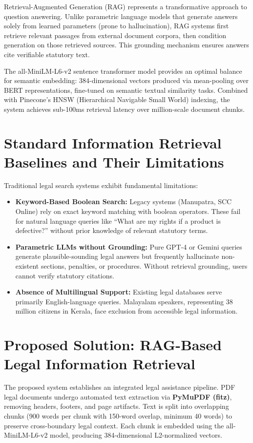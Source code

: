 \documentclass[12pt,a4paper]{report}
\begin{document}
Retrieval-Augmented Generation (RAG) represents a transformative approach to question answering. Unlike parametric language models that generate answers solely from learned parameters (prone to hallucination), RAG systems first retrieve relevant passages from external document corpora, then condition generation on those retrieved sources. This grounding mechanism ensures answers cite verifiable statutory text.

The all-MiniLM-L6-v2 sentence transformer model provides an optimal balance for semantic embedding: 384-dimensional vectors produced via mean-pooling over BERT representations, fine-tuned on semantic textual similarity tasks. Combined with Pinecone's HNSW (Hierarchical Navigable Small World) indexing, the system achieves sub-100ms retrieval latency over million-scale document chunks.

\section{Standard Information Retrieval Baselines and Their Limitations}
Traditional legal search systems exhibit fundamental limitations:
\begin{itemize}\setlength{\itemsep}{3pt}\setlength{\parskip}{0pt}\setlength{\parsep}{0pt}
    \item \textbf{Keyword-Based Boolean Search:} Legacy systems (Manupatra, SCC Online) rely on exact keyword matching with boolean operators. These fail for natural language queries like ``What are my rights if a product is defective?'' without prior knowledge of relevant statutory terms.
    \item \textbf{Parametric LLMs without Grounding:} Pure GPT-4 or Gemini queries generate plausible-sounding legal answers but frequently hallucinate non-existent sections, penalties, or procedures. Without retrieval grounding, users cannot verify statutory citations.
    \item \textbf{Absence of Multilingual Support:} Existing legal databases serve primarily English-language queries. Malayalam speakers, representing 38 million citizens in Kerala, face exclusion from accessible legal information.
\end{itemize}

\section{Proposed Solution: RAG-Based Legal Information Retrieval}
The proposed system establishes an integrated legal assistance pipeline. PDF legal documents undergo automated text extraction via \textbf{PyMuPDF (fitz)}, removing headers, footers, and page artifacts. Text is split into overlapping chunks (900 words per chunk with 150-word overlap, minimum 40 words) to preserve cross-boundary legal context. Each chunk is embedded using the all-MiniLM-L6-v2 model, producing 384-dimensional L2-normalized vectors.
\end{document}

